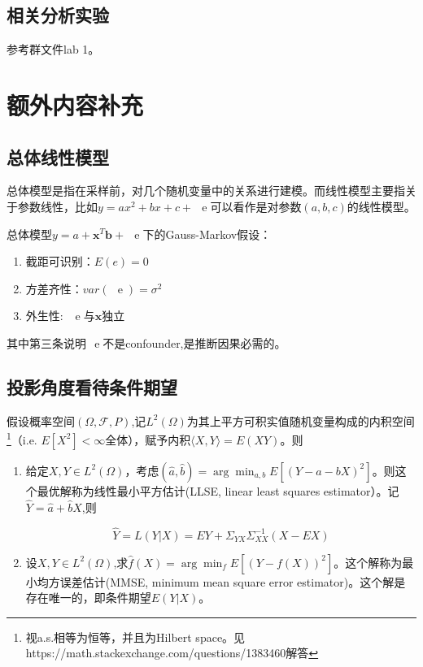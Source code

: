 \documentclass[cn,hazy,green,12pt,normal]{elegantnote}
\DeclareMathOperator{\e}{\!\!\;\mathrm e}
\newcommand{\MCF}{\mathscr F}
\numberwithin{equation}{section}
\numberwithin{subsection}{section}
\begin{document}
\subsection{相关分析实验}
参考群文件lab 1。

\section{额外内容补充}
\subsection{总体线性模型}
总体模型是指在采样前，对几个随机变量中的关系进行建模。而线性模型主要指关于参数线性，比如$y=a x^2+b x+c+\e$可以看作是对参数$(a,b,c)$的线性模型。

总体模型$y=a+\bm x^T \bm b+\e$下的Gauss-Markov假设：
\begin{enumerate}
    \item 截距可识别：$E(e)=0$
    \item 方差齐性：$var(\e)=\sigma^2$
    \item 外生性: $\e \text{与}\bm x$独立
\end{enumerate}
其中第三条说明$\e$不是confounder,是推断因果必需的。
\subsection{投影角度看待条件期望}
假设概率空间$(\Omega,\MCF,P)$,记$L^2(\Omega)$为其上平方可积实值随机变量构成的内积空间\footnote{视a.s.相等为恒等，并且为Hilbert space。见https://math.stackexchange.com/questions/1383460解答
}（i.e. $E[X^2]<\infty$全体），赋予内积$\langle X,Y \rangle=E(XY)$。则
\begin{proposition}

\begin{enumerate}
    \item  给定$X,Y \in L^2(\Omega)$，考虑$(\hat{a},\hat{b})=\arg \min_{a,b} E[(Y-a-bX)^2]$。则这个最优解称为线性最小平方估计(LLSE, linear least squares estimator）。记$\hat{Y}=\hat{a}+\hat{b}X$,则
    
    \[
\hat{Y}=L(Y|X)=EY+\Sigma_{YX}\Sigma^{-1}_{XX}(X-EX)
    \]
    \item 设$X,Y \in L^2(\Omega)$,求$\hat{f}(X)=\arg \min_{f} E[(Y-f(X))^2]$。这个解称为最小均方误差估计(MMSE, minimum mean square error estimator)。这个解是存在唯一的，即条件期望$E(Y|X)$。
\end{enumerate}
\end{proposition}
\end{document}
